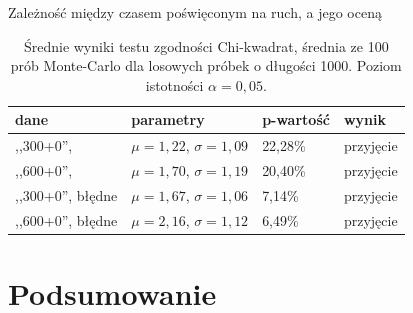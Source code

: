 \documentclass{beamer}
\begin{document}
\begin{frame}{Zależność między czasem poświęconym na ruch, a jego oceną}
	\begin{table}[h]
		\caption{Średnie wyniki testu zgodności Chi-kwadrat, średnia ze 100 prób Monte-Carlo dla losowych próbek o długości 1000. Poziom istotności $\alpha = 0,05$.}
		\centering
		\begin{tabular}{|l|l|l|l|}
			\hline
			\textbf{dane}                     & \textbf{parametry}& \textbf{p-wartość} & \textbf{wynik}     \\ \hline
			,,300+0'',  & $\mu = 1,22$, $\sigma = 1,09$& 22,28\%                    & przyjęcie\\ \hline
			,,600+0'',  & $\mu = 1,70$, $\sigma = 1,19$& 20,40\%                    & przyjęcie\\ \hline
			,,300+0'', błędne    & $\mu = 1,67$, $\sigma = 1,06$& 7,14\%                     & przyjęcie\\ \hline
			,,600+0'', błędne    & $\mu = 2,16$, $\sigma = 1,12$& 6,49\%                     & przyjęcie \\ \hline
		\end{tabular}
		\label{tab:testy} 
	\end{table}
\end{frame}
\section{Podsumowanie}
\end{document}
